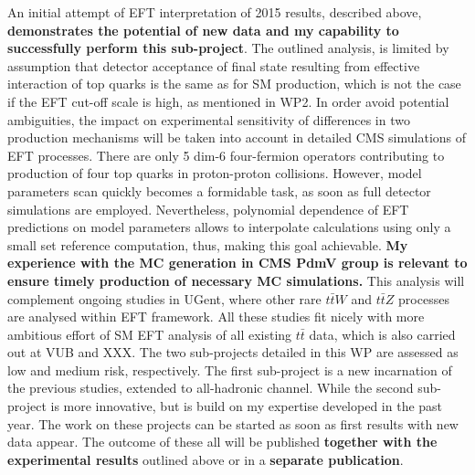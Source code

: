 \textcolor{\mynew}{
An initial attempt of EFT interpretation of 2015 results, described above, \textbf{demonstrates the potential of new data and my capability to successfully perform this sub-project}. The outlined analysis, is limited by assumption that detector acceptance of \tttt final state resulting from effective interaction of top quarks is the same as for SM \tttt production, which is not the case if the EFT cut-off scale is high, as mentioned in WP2. In order avoid potential ambiguities, the impact on experimental sensitivity of  differences in two production mechanisms will be taken into account in detailed CMS simulations of EFT processes. There are only 5 dim-6 four-fermion operators contributing to production of four top quarks in proton-proton collisions. However, model parameters scan quickly becomes a formidable task, as soon as full detector simulations are employed. Nevertheless, polynomial dependence of EFT predictions on model parameters allows to interpolate calculations using only a small set reference computation, thus, making this goal achievable. \textbf{My experience with the MC generation in CMS PdmV group is relevant to ensure timely production of necessary MC simulations.} This analysis will complement ongoing studies in UGent, where other rare $t\bar{t}W$ and $t\bar{t}Z$ processes are analysed within EFT framework. All these studies fit nicely with more ambitious effort of SM EFT analysis of all existing $t\bar{t}$ data, which is also carried out at VUB and XXX. 
}
\textcolor{\mynew}{
The two sub-projects detailed in this WP are assessed as low and medium risk, respectively. The first sub-project is a new incarnation of the previous studies, extended to all-hadronic channel. While the second sub-project is more innovative, but is build on my expertise developed in the past year. The work on these projects can be started as soon as first results with new data appear. The outcome of these all will be published \textbf{together with the experimental results} outlined above or in a \textbf{separate publication}.
}
